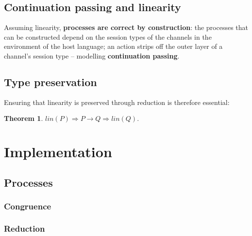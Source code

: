 \documentclass{mproj}
\newtheorem{theorem}{Theorem}
\begin{document}
\section{Continuation passing and linearity}\label{continuation-passing}


Assuming linearity, \textbf{processes are correct by construction}: the
processes that can be constructed depend on the session types of the channels in
the environment of the host language; an action strips off the outer layer of a
channel's session type -- modelling \textbf{continuation passing}.

\section{Type preservation}\label{type-preservation}

Ensuring that linearity is preserved through reduction is therefore essential:
\begin{theorem}
    $lin(P) \Rightarrow P \rightarrow Q \Rightarrow lin(Q).$
\end{theorem}

\chapter{Implementation}\label{implementation}

\section{Processes}\label{processes}
\subsection{Congruence}
\subsection{Reduction}
\end{document}

